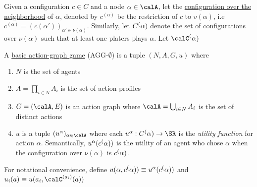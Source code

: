  \begin{definition}
 	\label{def:AGG-2.3}
 	Given a configuration $c\in C$ and a node $\alpha \in \calA$, let the \underline{configuration over the neighborhood} of $\alpha$, denoted by $c^{(\alpha)}$ be the restriction of $c$ to $v(\alpha)$, i.e $c^{(\alpha)} = (c(\alpha'))_{\alpha'\in \nu(\alpha)}$. Similarly, let $C^(\alpha)$ denote the set of configurations over $\nu(\alpha)$ such that at least one platers plays $\alpha$. Let $\calC^\Palpha$
 \end{definition}

\begin{definition}
	\label{def:AGG-2.4}
	A \underline{basic action-graph game} (AGG-$\emptyset$) is a tuple $(N, A, G, u)$ where 
	\begin{enumerate}
		\item \(N\) is the set of agents 
		\item \(A = \prod_{i\in N}A_i\) is the set of action profiles 
		\item \(G = (\calA, E)\) is an action graph where \(\calA = \bigcup_{i\in N}A_i\) is the set of distinct actions 
		\item \(u\) is a tuple \((u^\alpha)_{\alpha \in \calA}\) where each \(u^\alpha : C^\Palpha \to \SR\) is the \emph{utility function} for action \(\alpha\). Semantically, \(u^\alpha(c^(\alpha))\) is the utility of an agent who chose \(\alpha\) when the configuration over \(\nu(\alpha)\) is \(c^(\alpha)\).
	\end{enumerate}
\end{definition}
For notational convenience, define \(u(\alpha, c^(\alpha))\equiv u^\alpha(c^(\alpha))\) and \(u_i(a) \equiv u(a_i, \calC^{(a_i)}(a))\)
